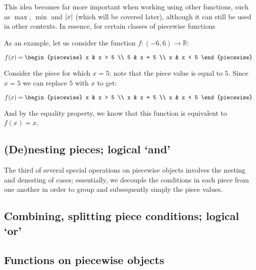 This idea becomes far more important when working using other functions, such as $\max$, $\min$ and $\abs{x}$ (which will be covered later), although it can still be used in other contexts. In essence, for certain classes of piecewise functions
\begin{example}
    As an example, let us consider the function $f:(-6, 6)\to\mathbb{R}$:

    $$
        f(x) = \begin{piecewise}
            x & x > 5 \\
            5 & x = 5 \\
            x & x < 5
        \end{piecewise}
    $$

    Consider the piece for which $x=5$: note that the piece value is equal to $5$. Since $x=5$ we can replace $5$ with $x$ to get:

    $$
        f(x) = \begin{piecewise}
            x & x > 5 \\
            x & x = 5 \\
            x & x < 5
        \end{piecewise}
    $$

    And by the equality property, we know that this function is equivalent to $f(x)=x$.
\end{example}

\subsection{(De)nesting pieces; logical `and'}
The third of several special operations on piecewise objects involves the nesting and denesting of cases; essentially, we decouple the conditions in each piece from one another in order to group and subsequently simply the piece values.
\subsection{Combining, splitting piece conditions; logical `or'}
\subsection{Functions on piecewise objects}
\newpage{}